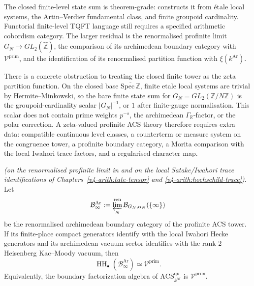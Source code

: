 \begin{remark}
\label{v4-arith:3d-acs:rem:qu-acs-form}
The closed finite-level state sum is theorem-grade:
 constructs it from étale
local systems, the Artin--Verdier fundamental class, and finite
groupoid cardinality. Functorial finite-level TQFT language still
requires a specified arithmetic cobordism category. The larger
residual is the renormalised profinite limit
\(G_{N}\to GL_{2}(\widehat{\mathbb Z})\), the comparison of its
archimedean boundary category with \(\mathcal V^{\mathrm{prim}}\), and
the identification of its renormalised partition function with
\(\xi(k^{\mathrm{Ar}})\).

There is a concrete obstruction to treating the closed finite tower as
the zeta partition function. On the closed base
\(\overline{\mathrm{Spec}\,\mathbb Z}\), finite etale local systems are
trivial by Hermite--Minkowski, so the bare finite state sum for
\(G_N=GL_2(\mathbb Z/N\mathbb Z)\) is the groupoid-cardinality scalar
\(|G_N|^{-1}\), or \(1\) after finite-gauge normalisation. This scalar
does not contain prime weights \(p^{-s}\), the archimedean
\(\Gamma_{\mathbb R}\)-factor, or the polar correction. A zeta-valued
profinite ACS theory therefore requires extra data: compatible
continuous level classes, a counterterm or measure system on the
congruence tower, a profinite boundary category, a Morita comparison
with the local Iwahori trace factors, and a regularised character map.
\end{remark}

\begin{theorem}
\label{v4-arith:3d-acs:thm:bulk-boundary-Vprim}
\ClaimStatusConditional \emph{(on the renormalised profinite limit in
 and on the local Satake/Iwahori
trace identifications of Chapters~\ref{v4-arith:tate-tensor} and
\ref{v4-arith:hochschild-trace})}. Let
\[
\mathcal B_{\infty}^{\mathrm{Ar}}
:=\varprojlim_{N}^{\mathrm{ren}}
\mathcal B_{G_{N},\alpha_{N}}(\{\infty\})
\]
be the renormalised archimedean boundary category of the profinite
ACS tower. If its finite-place compact generators identify with the
local Iwahori Hecke generators and its archimedean vacuum sector
identifies with the rank-\(2\) Heisenberg Kac--Moody vacuum, then
\[
\operatorname{HH}_{\bullet}(\mathcal B_{\infty}^{\mathrm{Ar}})
\simeq \mathcal V^{\mathrm{prim}}.
\]
Equivalently, the boundary factorization algebra of
\(\mathrm{ACS}^{\mathrm{qu}}_{k^{\mathrm{Ar}}}\) is
\(\mathcal V^{\mathrm{prim}}\).
\end{theorem}

